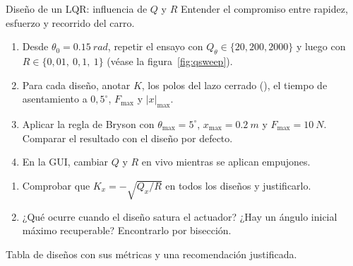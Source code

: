 \begin{practica}{Diseño de un LQR: influencia de $Q$ y $R$}
\objetivos Entender el compromiso entre rapidez, esfuerzo y recorrido del carro.
\procedimiento
\begin{enumerate}
  \item Desde $\theta_0=\SI{0.15}{rad}$, repetir el ensayo con $Q_\theta\in\{20,200,2000\}$ y luego con $R\in\{0{,}01,\ 0{,}1,\ 1\}$ (véase la figura~\ref{fig:qsweep}).
  \item Para cada diseño, anotar $K$, los polos del lazo cerrado (), el tiempo de asentamiento a $0{,}5^\circ$, $F_{\max}$ y $|x|_{\max}$.
  \item Aplicar la regla de Bryson con $\theta_{\max}=5^\circ$, $x_{\max}=\SI{0.2}{m}$ y $F_{\max}=\SI{10}{N}$. Comparar el resultado con el diseño por defecto.
  \item En la GUI, cambiar $Q$ y $R$ en vivo mientras se aplican empujones.
\end{enumerate}
\preguntas
\begin{enumerate}
  \item Comprobar que $K_x=-\sqrt{Q_x/R}$ en todos los diseños y justificarlo.
  \item ¿Qué ocurre cuando el diseño satura el actuador? ¿Hay un ángulo inicial máximo recuperable? Encontrarlo por bisección.
\end{enumerate}
\entregables Tabla de diseños con sus métricas y una recomendación justificada.
\end{practica}

